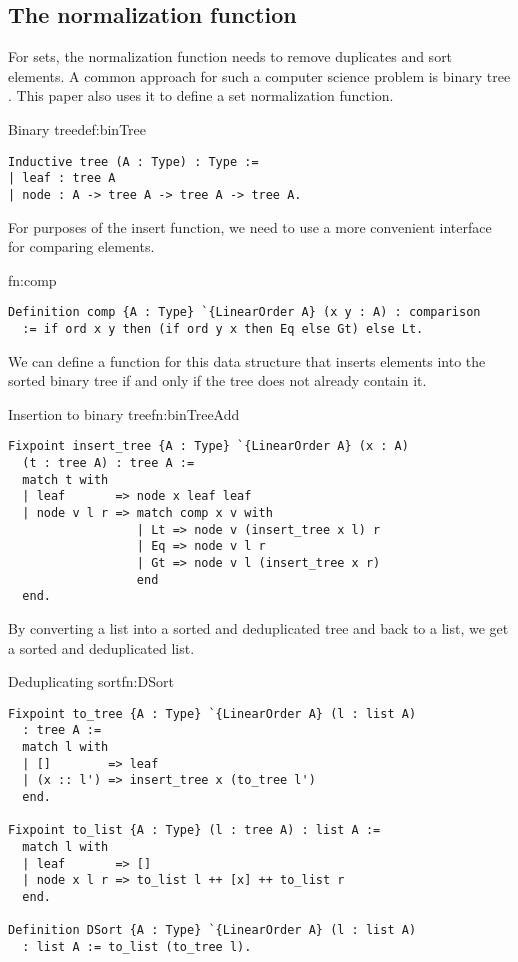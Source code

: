 \subsection{The normalization function}
For sets, the normalization function needs to remove duplicates and sort elements. A common approach for such a computer science problem is binary tree \cite{knuth}. This paper also uses it to define a set normalization function.
\begin{defi}{Binary tree}{def:binTree}
\begin{verbatim}
Inductive tree (A : Type) : Type :=
| leaf : tree A
| node : A -> tree A -> tree A -> tree A.
\end{verbatim}
\end{defi}
For purposes of the insert function, we need to use a more convenient interface for comparing elements.
\begin{func}{}{fn:comp}
\begin{verbatim}
Definition comp {A : Type} `{LinearOrder A} (x y : A) : comparison 
  := if ord x y then (if ord y x then Eq else Gt) else Lt.
\end{verbatim}
\end{func}
We can define a function for this data structure that inserts elements into the sorted binary tree if and only if the tree does not already contain it.
\begin{func}[D]{Insertion to binary tree}{fn:binTreeAdd}
\begin{verbatim}
Fixpoint insert_tree {A : Type} `{LinearOrder A} (x : A) 
  (t : tree A) : tree A :=
  match t with
  | leaf       => node x leaf leaf
  | node v l r => match comp x v with
                  | Lt => node v (insert_tree x l) r
                  | Eq => node v l r
                  | Gt => node v l (insert_tree x r)
                  end
  end.
\end{verbatim}
\end{func}
By converting a list into a sorted and deduplicated tree and back to a list, we get a sorted and deduplicated list.
\begin{func}{Deduplicating sort}{fn:DSort}
\begin{verbatim}
Fixpoint to_tree {A : Type} `{LinearOrder A} (l : list A) 
  : tree A := 
  match l with
  | []        => leaf
  | (x :: l') => insert_tree x (to_tree l')
  end.

Fixpoint to_list {A : Type} (l : tree A) : list A := 
  match l with
  | leaf       => []
  | node x l r => to_list l ++ [x] ++ to_list r
  end.

Definition DSort {A : Type} `{LinearOrder A} (l : list A) 
  : list A := to_list (to_tree l).
\end{verbatim}
\end{func}
